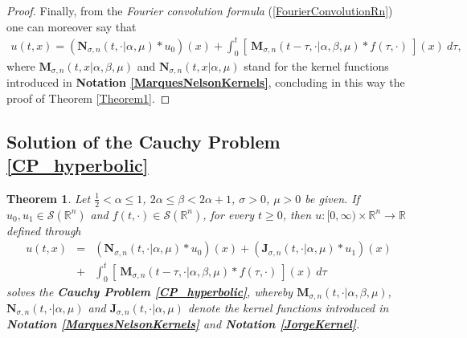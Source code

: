 \documentclass{amsart}
\newtheorem{theorem}{Theorem}[section]
\theoremstyle{definition}
\theoremstyle{remark}
\numberwithin{equation}{section}
\newcommand{\BR}{{\mathbb R}}
\begin{document}
\begin{proof}
	
	Finally, from the {\it Fourier convolution formula} (\ref{FourierConvolutionRn}) one can moreover say that
	\begin{eqnarray*}
		u(t,x)=\left({\bm N}_{\sigma,n}(t,\cdot|\alpha,\mu)*u_0\right)(x)+\int_{0}^t \left[~{\bm M}_{\sigma,n}(t-\tau,\cdot|\alpha,\beta,\mu)\ast f(\tau,\cdot)~\right](x)~d\tau,
	\end{eqnarray*}
	where ${\bm M}_{\sigma,n}(t,x|\alpha,\beta,\mu)$ and ${\bm N}_{\sigma,n}(t,x|\alpha,\mu)$ stand for the kernel functions introduced in {\bf Notation \ref{MarquesNelsonKernels}}, concluding in this way the proof of Theorem \ref{Theorem1}.
\end{proof}
	
	\subsection{Solution of the Cauchy Problem \ref{CP_hyperbolic}}\label{SolutionCP_hyperbolic}
	
	\begin{theorem}\label{Theorem2}
		Let $\frac{1}{2}<\alpha\leq 1$, $2\alpha\leq \beta< 2\alpha+1$, $\sigma>0$, $\mu>0$ 
		be given. 
		If $u_0,u_1\in \mathcal{S}(\mathbb{R}^n)$ and 
			$f(t,\cdot)\in \mathcal{S}(\mathbb{R}^n)$, for every $t\geq 0$,
			then $u: [0,\infty)\times \BR^n \longrightarrow \BR$ defined through \begin{eqnarray*}
				u(t,x)&=&({\bm N}_{\sigma,n}(t,\cdot|\alpha,\mu)*u_0)(x)+({\bm J}_{\sigma,n}(t,\cdot|\alpha,\mu)*u_1)(x) \\
				&+&\int_{0}^t \left[~{\bm M}_{\sigma,n}(t-\tau,\cdot|\alpha,\beta,\mu)\ast f(\tau,\cdot)~\right](x)~d\tau 
			\end{eqnarray*} solves the {\bf Cauchy Problem \ref{CP_hyperbolic}}, whereby ${\bm M}_{\sigma,n}(t,\cdot|\alpha,\beta,\mu)$, ${\bm N}_{\sigma,n}(t,\cdot|\alpha,\mu)$ and ${\bm J}_{\sigma,n}(t,\cdot|\alpha,\mu)$ denote the kernel functions introduced in {\bf Notation \ref{MarquesNelsonKernels}} and {\bf Notation \ref{JorgeKernel}}.
		\end{theorem} 
		
\end{document}
